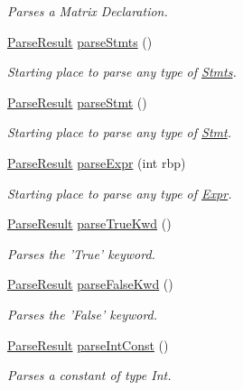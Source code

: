 \begin{DoxyCompactItemize}
\begin{DoxyCompactList}\small\item\em Parses a Matrix Declaration. \end{DoxyCompactList}\item 
\hyperlink{classParseResult}{Parse\-Result} \hyperlink{classParser_a452db3def31683cb0305e57a01489bd4}{parse\-Stmts} ()
\begin{DoxyCompactList}\small\item\em Starting place to parse any type of \hyperlink{classStmts}{Stmts}. \end{DoxyCompactList}\item 
\hyperlink{classParseResult}{Parse\-Result} \hyperlink{classParser_a9709c4793d0cce012d595f3ee416cd25}{parse\-Stmt} ()
\begin{DoxyCompactList}\small\item\em Starting place to parse any type of \hyperlink{classStmt}{Stmt}. \end{DoxyCompactList}\item 
\hyperlink{classParseResult}{Parse\-Result} \hyperlink{classParser_a50227dc24dc7a175ac0533d9957dfcf8}{parse\-Expr} (int rbp)
\begin{DoxyCompactList}\small\item\em Starting place to parse any type of \hyperlink{classExpr}{Expr}. \end{DoxyCompactList}\item 
\hyperlink{classParseResult}{Parse\-Result} \hyperlink{classParser_ad40f1e5e4c66814f959d982f94b767a3}{parse\-True\-Kwd} ()
\begin{DoxyCompactList}\small\item\em Parses the 'True' keyword. \end{DoxyCompactList}\item 
\hyperlink{classParseResult}{Parse\-Result} \hyperlink{classParser_a56f03d2e70d12648c55ce56a11e63324}{parse\-False\-Kwd} ()
\begin{DoxyCompactList}\small\item\em Parses the 'False' keyword. \end{DoxyCompactList}\item 
\hyperlink{classParseResult}{Parse\-Result} \hyperlink{classParser_a2b200b744e5bedf82ef6f610d7877cfc}{parse\-Int\-Const} ()
\begin{DoxyCompactList}\small\item\em Parses a constant of type Int. \end{DoxyCompactList}\item 

\end{DoxyCompactItemize}
